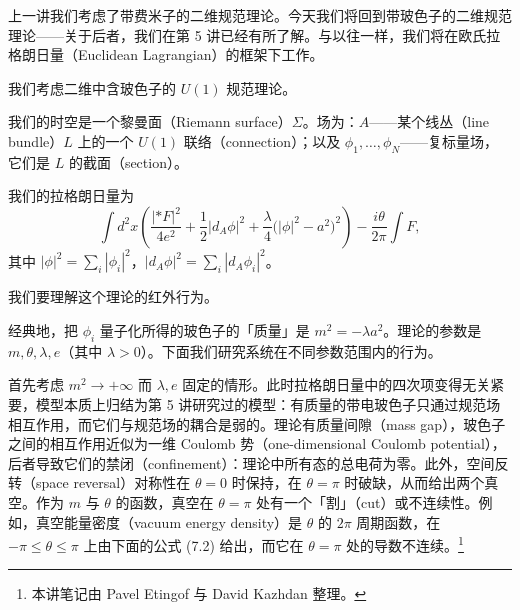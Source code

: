 上一讲我们考虑了带费米子的二维规范理论。今天我们将回到带玻色子的二维规范理论——关于后者，我们在第 5 讲已经有所了解。与以往一样，我们将在欧氏拉格朗日量（Euclidean Lagrangian）的框架下工作。

我们考虑二维中含玻色子的 $U(1)$ 规范理论。

我们的时空是一个黎曼面（Riemann surface）$\Sigma$。场为：$A$——某个线丛（line bundle）$L$ 上的一个 $U(1)$ 联络（connection）；以及 $\phi_1,\dots,\phi_N$——复标量场，它们是 $L$ 的截面（section）。

我们的拉格朗日量为
\begin{equation}
  \tag{7.1}
  \label{eq:7-1}
  \int d^2x\left(\frac{|{*}F|^2}{4e^2}+\frac12|d_A\phi|^2+\frac{\lambda}{4}\bigl(|\phi|^2-a^2\bigr)^2\right)-\frac{i\theta}{2\pi}\int F,
\end{equation}
其中 $|\phi|^2=\sum_i|\phi_i|^2$，$|d_A\phi|^2=\sum_i|d_A\phi_i|^2$。

我们要理解这个理论的红外行为。

经典地，把 $\phi_i$ 量子化所得的玻色子的「质量」是 $m^2=-\lambda a^2$。理论的参数是 $m,\theta,\lambda,e$（其中 $\lambda>0$）。下面我们研究系统在不同参数范围内的行为。

首先考虑 $m^2\to+\infty$ 而 $\lambda,e$ 固定的情形。此时拉格朗日量中的四次项变得无关紧要，模型本质上归结为第 5 讲研究过的模型：有质量的带电玻色子只通过规范场相互作用，而它们与规范场的耦合是弱的。理论有质量间隙（mass gap），玻色子之间的相互作用近似为一维 Coulomb 势（one-dimensional Coulomb potential），后者导致它们的禁闭（confinement）：理论中所有态的总电荷为零。此外，空间反转（space reversal）对称性在 $\theta=0$ 时保持，在 $\theta=\pi$ 时破缺，从而给出两个真空。作为 $m$ 与 $\theta$ 的函数，真空在 $\theta=\pi$ 处有一个「割」（cut）或不连续性。例如，真空能量密度（vacuum energy density）是 $\theta$ 的 $2\pi$ 周期函数，在 $-\pi\le\theta\le\pi$ 上由下面的公式 (7.2) 给出，而它在 $\theta=\pi$ 处的导数不连续。\footnote{本讲笔记由 Pavel Etingof 与 David Kazhdan 整理。}



